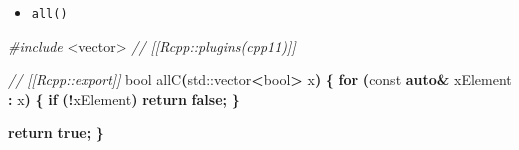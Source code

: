 \documentclass[
]{book}
\newenvironment{Shaded}{\begin{snugshade}}{\end{snugshade}}
\newcommand{\AttributeTok}[1]{\textcolor[rgb]{0.77,0.63,0.00}{#1}}
\newcommand{\BuiltInTok}[1]{#1}
\newcommand{\CommentTok}[1]{\textcolor[rgb]{0.56,0.35,0.01}{\textit{#1}}}
\newcommand{\ControlFlowTok}[1]{\textcolor[rgb]{0.13,0.29,0.53}{\textbf{#1}}}
\newcommand{\DataTypeTok}[1]{\textcolor[rgb]{0.13,0.29,0.53}{#1}}
\newcommand{\ImportTok}[1]{#1}
\newcommand{\KeywordTok}[1]{\textcolor[rgb]{0.13,0.29,0.53}{\textbf{#1}}}
\newcommand{\NormalTok}[1]{#1}
\newcommand{\OperatorTok}[1]{\textcolor[rgb]{0.81,0.36,0.00}{\textbf{#1}}}
\newcommand{\PreprocessorTok}[1]{\textcolor[rgb]{0.56,0.35,0.01}{\textit{#1}}}
\providecommand{\tightlist}{%
  \setlength{\itemsep}{0pt}\setlength{\parskip}{0pt}}
\begin{document}
\begin{itemize}
\tightlist
\item
  \texttt{all()}
\end{itemize}

\begin{Shaded}
\begin{Highlighting}[]
\PreprocessorTok{\#include }\ImportTok{\textless{}vector\textgreater{}}
\CommentTok{// [[Rcpp::plugins(cpp11)]]}

\CommentTok{// [[Rcpp::export]]}
\DataTypeTok{bool}\NormalTok{ allC}\OperatorTok{(}\BuiltInTok{std::}\NormalTok{vector}\OperatorTok{\textless{}}\DataTypeTok{bool}\OperatorTok{\textgreater{}}\NormalTok{ x}\OperatorTok{)}
\OperatorTok{\{}
    \ControlFlowTok{for} \OperatorTok{(}\AttributeTok{const} \KeywordTok{auto}\OperatorTok{\&}\NormalTok{ xElement }\OperatorTok{:}\NormalTok{ x}\OperatorTok{)}
    \OperatorTok{\{}
        \ControlFlowTok{if} \OperatorTok{(!}\NormalTok{xElement}\OperatorTok{)} \ControlFlowTok{return} \KeywordTok{false}\OperatorTok{;}
    \OperatorTok{\}}

    \ControlFlowTok{return} \KeywordTok{true}\OperatorTok{;}
\OperatorTok{\}}
\end{Highlighting}
\end{Shaded}
\end{document}
